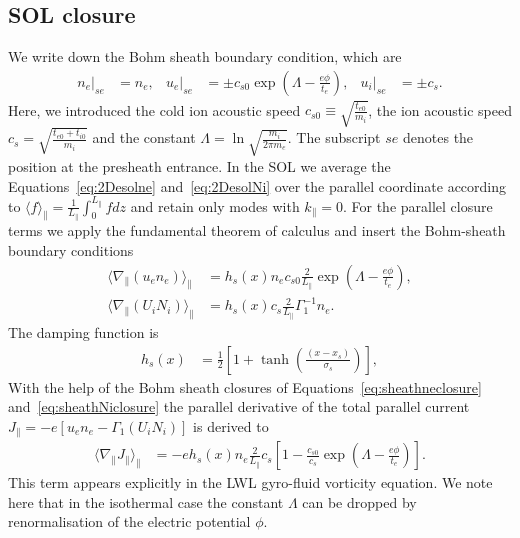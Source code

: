 \subsection{SOL closure}\label{sec:solclosure}
We write down the Bohm sheath boundary condition, which are 
\begin{align}
 n_e \Big|_{se} &= n_e, &
 u_e \Big|_{se} &= \pm c_{s0} \exp{\left(\Lambda-\frac{e \phi}{t_e}\right)},&
 u_i \Big|_{se} &= \pm c_{s}.
\end{align}
Here, we introduced the cold ion acoustic speed \(c_{s0} \equiv \sqrt{\frac{t_{e0} }{ m_i}}\), the ion acoustic speed \(c_{s} = \sqrt{\frac{t_{e0} + t_{i0} }{ m_i}}\) and the constant \(\Lambda = \ln{\sqrt{ \frac{m_i}{2 \pi m_e} }}\). 
The subscript \(se\) denotes the position at the presheath entrance.
In the  SOL we average the Equations~\eqref{eq:2Desolne} and~\eqref{eq:2DesolNi} over the parallel coordinate 
according to \(\langle f\rangle_\parallel =  \frac{1}{L_\parallel} \int_{0}^{L_\parallel} f d z \) and retain only modes with \(k_\parallel = 0\). 
For the parallel closure terms we apply the fundamental theorem of calculus and insert the Bohm-sheath boundary conditions
\begin{align}\label{eq:sheathneclosure}
 \langle \nabla_\parallel (u_e n_e)  \rangle_\parallel 
 &=
		       h_{s}(x)  n_e c_{s0} \frac{2}{L_\parallel}\exp{\left(\Lambda-\frac{e \phi}{t_e}\right)}, \\
		        \label{eq:sheathNiclosure}
   \langle \nabla_\parallel (U_i N_i)   \rangle_\parallel
		      &= h_{s}(x) c_{s} \frac{2}{L_\parallel}  \Gamma_1^{-1}  n_e .
\end{align}
The damping function is 
\begin{align}
 h_{s}(x) &=\frac{1}{2}\left[1+ \tanh{\left(\frac{(x-x_s)}{\sigma_s}\right)}\right] ,
\end{align}
With the help of the Bohm sheath closures of Equations~\eqref{eq:sheathneclosure} and~\eqref{eq:sheathNiclosure} the parallel derivative of the total parallel current 
\(J_\parallel = -e  \left[u_e n_e - \Gamma_1 (U_i N_i)\right] \) is derived to
\begin{align}
 \langle \nabla_\parallel  J_\parallel \rangle_\parallel &= - e h_{s}(x)  n_e  \frac{2}{L_\parallel}c_{s}  \left[1-\frac{c_{s0}}{ c_{s} } \exp{\left(\Lambda-\frac{e \phi}{t_e}\right)} \right].
\end{align}
This term appears explicitly in the LWL gyro-fluid vorticity equation. We note here that in the isothermal case the constant \(\Lambda\) can be dropped by renormalisation of the electric potential \(\phi\).
